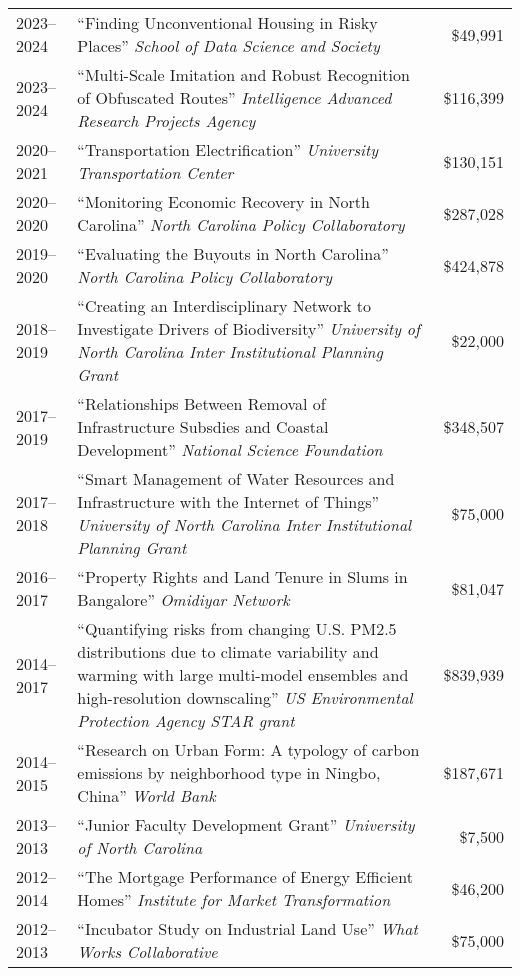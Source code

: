 \documentclass[11pt,a4paper,]{awesome-cv}
\begin{document}
\begin{longtable}{lp{11.3cm}r}
  2023--2024 & ``Finding Unconventional Housing in Risky Places''   \emph{School of Data Science and Society} & \$49,991 \\ 
  2023--2024 & ``Multi-Scale Imitation and Robust Recognition of Obfuscated Routes''    \emph{Intelligence Advanced Research Projects Agency} & \$116,399 \\ 
  2020--2021 & ``Transportation Electrification''   \emph{University Transportation Center} & \$130,151 \\ 
  2020--2020 & ``Monitoring Economic Recovery in North Carolina''   \emph{North Carolina Policy Collaboratory} & \$287,028 \\ 
  2019--2020 & ``Evaluating the Buyouts in North Carolina'' \emph{North Carolina Policy Collaboratory} & \$424,878 \\ 
  2018--2019 & ``Creating an Interdisciplinary Network to Investigate Drivers of Biodiversity'' \emph{University of North Carolina Inter Institutional Planning Grant} & \$22,000 \\ 
  2017--2019 & ``Relationships Between Removal of Infrastructure Subsdies and Coastal Development'' \emph{National Science Foundation} & \$348,507 \\ 
  2017--2018 & ``Smart Management of Water Resources and Infrastructure with the Internet of Things''   \emph{University of North Carolina Inter Institutional Planning Grant} & \$75,000 \\ 
  2016--2017 & ``Property Rights and Land Tenure in Slums in Bangalore''    \emph{Omidiyar Network} & \$81,047 \\ 
  2014--2017 & ``Quantifying risks from changing U.S. PM2.5 distributions due to climate variability and warming with large multi-model ensembles and high-resolution downscaling'' \emph{US Environmental Protection Agency STAR grant} & \$839,939 \\ 
  2014--2015 & ``Research on Urban Form: A typology of carbon emissions by neighborhood type in Ningbo, China'' \emph{World Bank} & \$187,671 \\ 
  2013--2013 & ``Junior Faculty Development Grant'' \emph{University of North Carolina} & \$7,500 \\ 
  2012--2014 & ``The Mortgage Performance of Energy Efficient Homes''   \emph{Institute for Market Transformation} & \$46,200 \\ 
  2012--2013 & ``Incubator Study on Industrial Land Use''   \emph{What Works Collaborative} & \$75,000 \\ 

\end{longtable}
\end{document}
